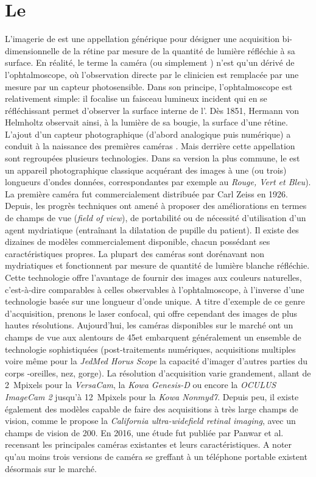 \section{Le \fundus{}}
L'imagerie de \fundus{} est une appellation générique pour désigner une acquisition bi-dimensionnelle de la rétine par mesure de la quantité de lumière réfléchie à sa surface. En réalité, le terme la caméra \fundus{} (ou simplement \fundus) n'est qu'un dérivé de l'ophtalmoscope, où l'observation directe par le clinicien est remplacée par une mesure par un capteur photosensible. Dans son principe, l'ophtalmoscope est relativement simple: il focalise un faisceau lumineux incident qui en se réfléchissant permet d'observer la surface interne de l'\oeil{}. Dès 1851, Hermann von Helmholtz observait ainsi, à la lumière de sa bougie, la surface d'une rétine. 
L'ajout d'un capteur photographique (d'abord analogique puis numérique) a conduit à la naissance des premières caméras \fundus{}. Mais derrière cette appellation sont regroupées plusieurs technologies. Dans sa version la plus commune, le \fundus{} est un appareil photographique classique acquérant des images à une (ou trois) longueurs d'ondes données, correspondantes par exemple au \textit{Rouge, Vert et Bleu}). La première caméra \fundus{} fut commercialement distribuée par Carl Zeiss en 1926. Depuis, les progrès techniques ont amené à proposer des améliorations en termes de champs de vue (\textit{field of view}), de portabilité ou de nécessité d'utilisation d'un agent mydriatique (entraînant la dilatation de pupille du patient). Il existe des dizaines de modèles commercialement disponible, chacun possédant ses caractéristiques propres. La plupart des caméras sont dorénavant non mydriatiques et fonctionnent par mesure de quantité de lumière blanche réfléchie. Cette technologie offre l'avantage de fournir des images aux couleurs naturelles, c'est-à-dire comparables à celles observables à l'ophtalmoscope, à l'inverse d'une technologie basée sur une longueur d'onde unique. A titre d'exemple de ce genre d'acquisition, prenons le laser confocal, qui offre cependant des images de plus hautes résolutions. Aujourd'hui, les caméras disponibles sur le marché ont un champs de vue aux alentours de 45\degree et embarquent généralement un ensemble de technologie sophistiquées (post-traitements numériques, acquisitions multiples voire même pour la \textit{JedMed Horus Scope} la capacité d'imager d'autres parties du corps -oreilles, nez, gorge). La résolution d'acquisition varie grandement, allant de \SI{2}{\mega pixels} pour la \textit{VersaCam}, la \textit{Kowa Genesis-D} ou encore la \textit{OCULUS ImageCam 2} jusqu'à \SI{12}{\mega pixels} pour la \textit{Kowa Nonmyd7}. Depuis peu, il existe également des modèles capable de faire des acquisitions à très large champs de vision, comme le propose la \textit{California ultra-widefield retinal imaging}, avec un champs de vision de 200\degree. En 2016, une étude fut publiée par Panwar et al.\cite{panwarFundusPhotography21st2016} recensant les principales caméras existantes et leurs caractéristiques. A noter qu'au moins trois versions de caméra \fundus se greffant à un téléphone portable existent désormais sur le marché.

